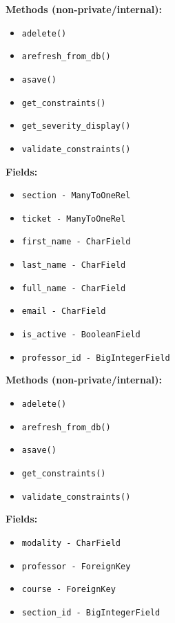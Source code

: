 \documentclass[oneside,openany,obeyspaces]{book}
\begin{document}
\begin{flushleft}
    \textbf{Methods (non-private/internal):}
    \begin{itemize}
        \item \texttt{adelete()}
        \item \texttt{arefresh\_from\_db()}
        \item \texttt{asave()}
        \item \texttt{get\_constraints()}
        \item \texttt{get\_severity\_display()}
        \item \texttt{validate\_constraints()}
    \end{itemize}

    \textbf{Fields:}
    \begin{itemize}
        \item \texttt{section - ManyToOneRel}
        \item \texttt{ticket - ManyToOneRel}
        \item \texttt{first\_name - CharField}
        \item \texttt{last\_name - CharField}
        \item \texttt{full\_name - CharField}
        \item \texttt{email - CharField}
        \item \texttt{is\_active - BooleanField}
        \item \texttt{professor\_id - BigIntegerField}
    \end{itemize}

    \textbf{Methods (non-private/internal):}
    \begin{itemize}
        \item \texttt{adelete()}
        \item \texttt{arefresh\_from\_db()}
        \item \texttt{asave()}
        \item \texttt{get\_constraints()}
        \item \texttt{validate\_constraints()}
    \end{itemize}

    \textbf{Fields:}
    \begin{itemize}
        \item \texttt{modality - CharField}
        \item \texttt{professor - ForeignKey}
        \item \texttt{course - ForeignKey}
        \item \texttt{section\_id - BigIntegerField}
    \end{itemize}


\end{flushleft}
\end{document}
